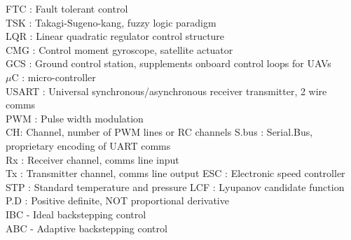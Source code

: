 \documentclass[a4paper, 11pt, oneside, openright, parskip=full]{book}
\begin{document}
FTC : Fault tolerant control\\
TSK : Takagi-Sugeno-kang, fuzzy logic paradigm\\
LQR : Linear quadratic regulator control structure\\
CMG : Control moment gyroscope, satellite actuator\\
GCS : Ground control station, supplements onboard control loops for UAVs\\
$\mu$C : micro-controller\\
USART : Universal synchronous/asynchronous receiver transmitter, 2 wire comms\\
PWM : Pulse width modulation\\
CH: Channel, number of PWM lines or RC channels
S.bus : Serial.Bus, proprietary encoding of UART comms\\
Rx : Receiver channel, comms line input\\
Tx : Transmitter channel, comms line output
ESC : Electronic speed controller\\
STP : Standard temperature and pressure
LCF : Lyupanov candidate function\\
P.D : Positive definite, NOT proportional derivative\\
IBC - Ideal backstepping control\\
ABC - Adaptive backstepping control\\
\end{document}
